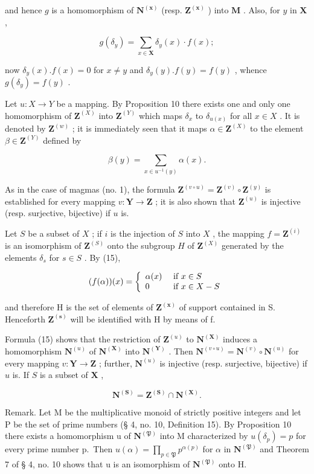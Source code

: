 and hence \(g\) is a homomorphism of \(\mathbf{N}^{(\mathbf{x})}\) (resp. \(\mathbf{Z}^{(\mathbf{x})}\) ) into \(\mathbf{M}\) . Also, for \(y\) in \(\mathbf{X}\) ,

\[
g (\delta_ {y}) = \sum_ {x \in \mathbf {X}} \delta_ {y} (x) \cdot f (x);
\]

now \(\delta_y(x).f(x) = 0\) for \(x\neq y\) and \(\delta_y(y).f(y) = f(y)\) , whence \(g(\delta_y) = f(y)\) .

Let \(u: X \to Y\) be a mapping. By Proposition 10 there exists one and only one homomorphism of \(\mathbf{Z}^{(X)}\) into \(\mathbf{Z}^{(Y)}\) which maps \(\delta_x\) to \(\delta_{u(x)}\) for all \(x \in X\) . It is denoted by \(\mathbf{Z}^{(w)}\) ; it is immediately seen that it maps \(\alpha \in \mathbf{Z}^{(X)}\) to the element \(\beta \in \mathbf{Z}^{(Y)}\) defined by

\[
\beta (y) = \sum_ {x \in u ^ {- 1} (y)} \alpha (x).\tag{15}
\]

As in the case of magmas (no. 1), the formula \(\mathbf{Z}^{(v\circ u)} = \mathbf{Z}^{(v)}\circ \mathbf{Z}^{(y)}\) is established for every mapping \(v\colon \mathbf{Y}\to \mathbf{Z}\) ; it is also shown that \(\mathbf{Z}^{(u)}\) is injective (resp. surjective, bijective) if \(u\) is.

Let \(S\) be a subset of \(X\) ; if \(i\) is the injection of \(S\) into \(X\) , the mapping \(f = \mathbf{Z}^{(i)}\) is an isomorphism of \(\mathbf{Z}^{(S)}\) onto the subgroup \(H\) of \(\mathbf{Z}^{(X)}\) generated by the elements \(\delta_s\) for \(s \in S\) . By (15),

\[
(f (\alpha)) (x) = \left\{ \begin{array}{l l} \alpha (x) & \text { if } x \in S \\ 0 & \text { if } x \in X - S \end{array} \right.
\]

and therefore H is the set of elements of \(\mathbf{Z}^{(\mathbf{x})}\) of support contained in S. Henceforth \(\mathbf{Z}^{(\mathbf{s})}\) will be identified with H by means of f.

Formula (15) shows that the restriction of \(\mathbf{Z}^{(u)}\) to \(\mathbf{N}^{(\mathbf{X})}\) induces a homomorphism \(\mathbf{N}^{(u)}\) of \(\mathbf{N}^{(\mathbf{X})}\) into \(\mathbf{N}^{(\mathbf{Y})}\) . Then \(\mathbf{N}^{(v\circ u)} = \mathbf{N}^{(v)}\circ \mathbf{N}^{(u)}\) for every mapping \(v\colon \mathbf{Y}\to \mathbf{Z}\) ; further, \(\mathbf{N}^{(u)}\) is injective (resp. surjective, bijective) if \(u\) is. If \(S\) is a subset of \(\mathbf{X}\) ,

\[
\mathbf {N} ^ {(\mathbf {S})} = \mathbf {Z} ^ {(\mathbf {S})} \cap \mathbf {N} ^ {(\mathbf {X})}.
\]

Remark. Let M be the multiplicative monoid of strictly positive integers and let P be the set of prime numbers (§ 4, no. 10, Definition 15). By Proposition 10 there exists a homomorphism u of \(\mathbf{N}^{(\mathfrak{P})}\) into M characterized by \(u(\delta_{p}) = p\) for every prime number p.~Then \(u(\alpha) = \prod_{p \in \mathfrak{P}} p^{\alpha(p)}\) for \(\alpha\) in \(\mathbf{N}^{(\mathfrak{P})}\) and Theorem 7 of § 4, no. 10 shows that u is an isomorphism of \(\mathbf{N}^{(\mathfrak{P})}\) onto H.

